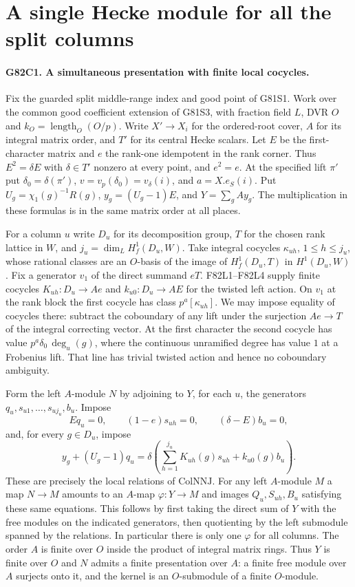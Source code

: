 \section{A single Hecke module for all the split columns}

\paragraph{G82C1. A simultaneous presentation with finite local cocycles.}
Fix the guarded split middle-range index and good point of G81S1.
Work over the common good coefficient extension of G81S3, with fraction
field $L$, DVR $O$ and $k_O=\operatorname{length}_O(O/p)$.
Write $X'\to X_i$ for the ordered-root cover, $A$ for its integral
matrix order, and $T'$ for its central Hecke scalars. Let $E$ be the
first-character matrix and $e$ the rank-one idempotent in the rank
corner. Thus $E^2=\delta E$ with $\delta\in T'$ nonzero at every
point, and $e^2=e$. At the specified lift $\pi'$ put
$\delta_0=\delta(\pi')$, $v=v_p(\delta_0)=v_\delta(i)$, and
$a=X.e_S(i)$. Put $U_g=\chi_1(g)^{-1}R(g)$, $y_g=(U_g-1)E$,
and $Y=\sum_g A y_g$. The multiplication in these formulas is in
the same matrix order at all places.

For a column $u$ write $D_u$ for its decomposition group,
$T$ for the chosen rank lattice in $W$, and
$j_u=\dim_L H_f^1(D_u,W)$. Take integral cocycles
$\kappa_{uh}$, $1\le h\le j_u$, whose rational classes are an
$O$-basis of the image of $H_f^1(D_u,T)$ in $H^1(D_u,W)$.
Fix a generator $v_1$ of the direct summand $eT$. F82L1--F82L4
supply finite cocycles $K_{uh}:D_u\to Ae$ and $k_{u0}:D_u\to AE$
for the twisted left action. On $v_1$ at the rank block the
first cocycle has class $p^a[\kappa_{uh}]$. We may impose equality
of cocycles there: subtract the coboundary of any lift under the
surjection $Ae\to T$ of the integral correcting vector. At the
first character the second cocycle has value
$p^a\delta_0\,\deg_u(g)$, where the continuous unramified degree
has value $1$ at a Frobenius lift. That line has trivial twisted
action and hence no coboundary ambiguity.

Form the left $A$-module $N$ by adjoining to $Y$, for each $u$,
the generators $q_u,s_{u1},\ldots,s_{u j_u},b_u$. Impose
\[
 E q_u=0,\qquad (1-e)s_{uh}=0,\qquad (\delta-E)b_u=0,
\]
and, for every $g\in D_u$, impose
\[
 y_g+(U_g-1)q_u
    =\delta\left(\sum_{h=1}^{j_u}K_{uh}(g)s_{uh}
                          +k_{u0}(g)b_u\right).
\]
These are precisely the local relations of $\mathrm{ColNNJ}$.
For any left $A$-module $M$ a map $N\to M$ amounts to an
$A$-map $\varphi:Y\to M$ and images $Q_u,S_{uh},B_u$ satisfying
these same equations. This follows by first taking the direct sum
of $Y$ with the free modules on the indicated generators, then
quotienting by the left submodule spanned by the relations.
In particular there is only one $\varphi$ for all columns. The order
$A$ is finite over $O$ inside the product of integral matrix rings.
Thus $Y$ is finite over $O$ and $N$ admits a finite presentation over
$A$: a finite free module over $A$ surjects onto it, and the kernel
is an $O$-submodule of a finite $O$-module.

